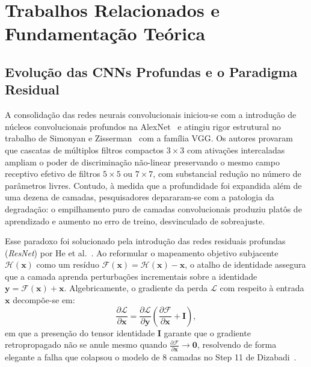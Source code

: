 \documentclass[runningheads]{llncs}
\begin{document}
\section{Trabalhos Relacionados e Fundamenta\c{c}\~{a}o Te\'{o}rica}
\label{sec:related}

\subsection{Evolu\c{c}\~{a}o das CNNs Profundas e o Paradigma Residual}
A consolida\c{c}\~{a}o das redes neurais convolucionais iniciou-se com a introdu\c{c}\~{a}o de n\'{u}cleos convolucionais profundos na AlexNet~\cite{krizhevsky2009learning} e atingiu rigor estrutural no trabalho de Simonyan e Zisserman~\cite{simonyan2014very} com a fam\'{i}lia VGG. Os autores provaram que cascatas de m\'{u}ltiplos filtros compactos $3 \times 3$ com ativa\c{c}\~{o}es intercaladas ampliam o poder de discrimina\c{c}\~{a}o n\~{a}o-linear preservando o mesmo campo receptivo efetivo de filtros $5 \times 5$ ou $7 \times 7$, com substancial redu\c{c}\~{a}o no n\'{u}mero de par\^{a}metros livres. Contudo, \`{a} medida que a profundidade foi expandida al\'{e}m de uma dezena de camadas, pesquisadores depararam-se com a patologia da degrada\c{c}\~{a}o: o empilhamento puro de camadas convolucionais produziu plat\^{o}s de aprendizado e aumento no erro de treino, desvinculado de sobreajuste.

Esse paradoxo foi solucionado pela introdu\c{c}\~{a}o das redes residuais profundas (\textit{ResNet}) por He et al.~\cite{he2016deep}. Ao reformular o mapeamento objetivo subjacente $\mathcal{H}(\mathbf{x})$ como um res\'{i}duo $\mathcal{F}(\mathbf{x}) = \mathcal{H}(\mathbf{x}) - \mathbf{x}$, o atalho de identidade assegura que a camada aprenda perturba\c{c}\~{o}es incrementais sobre a identidade $\mathbf{y} = \mathcal{F}(\mathbf{x}) + \mathbf{x}$. Algebricamente, o gradiente da perda $\mathcal{L}$ com respeito \`{a} entrada $\mathbf{x}$ decomp\~{o}e-se em:
\begin{equation}
    \frac{\partial \mathcal{L}}{\partial \mathbf{x}} = \frac{\partial \mathcal{L}}{\partial \mathbf{y}} \left( \frac{\partial \mathcal{F}}{\partial \mathbf{x}} + \mathbf{I} \right),
    \label{eq:grad_residual}
\end{equation}
em que a presen\c{c}\~{a}o do tensor identidade $\mathbf{I}$ garante que o gradiente retropropagado n\~{a}o se anule mesmo quando $\frac{\partial \mathcal{F}}{\partial \mathbf{x}} \to \mathbf{0}$, resolvendo de forma elegante a falha que colapsou o modelo de 8 camadas no Step 11 de Dizabadi~\cite{dizabadi2026empirical}.
\end{document}

